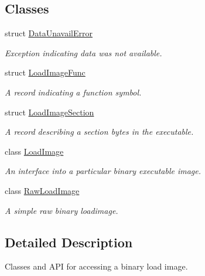 \subsection*{Classes}
\begin{DoxyCompactItemize}
\item 
struct \mbox{\hyperlink{struct_data_unavail_error}{Data\+Unavail\+Error}}
\begin{DoxyCompactList}\small\item\em Exception indicating data was not available. \end{DoxyCompactList}\item 
struct \mbox{\hyperlink{struct_load_image_func}{Load\+Image\+Func}}
\begin{DoxyCompactList}\small\item\em A record indicating a function symbol. \end{DoxyCompactList}\item 
struct \mbox{\hyperlink{struct_load_image_section}{Load\+Image\+Section}}
\begin{DoxyCompactList}\small\item\em A record describing a section bytes in the executable. \end{DoxyCompactList}\item 
class \mbox{\hyperlink{class_load_image}{Load\+Image}}
\begin{DoxyCompactList}\small\item\em An interface into a particular binary executable image. \end{DoxyCompactList}\item 
class \mbox{\hyperlink{class_raw_load_image}{Raw\+Load\+Image}}
\begin{DoxyCompactList}\small\item\em A simple raw binary loadimage. \end{DoxyCompactList}\end{DoxyCompactItemize}


\subsection{Detailed Description}
Classes and A\+PI for accessing a binary load image. 

